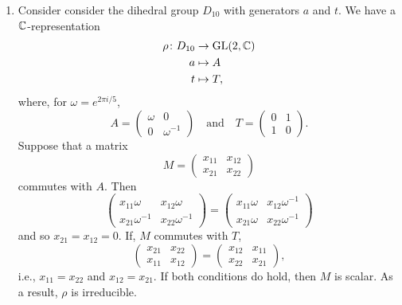 \begin{xmpls}
\begin{enumerate}[\rm a)]
        \item Consider consider the dihedral group $D_{10}$ with generators $a$ and $t$. We have a $\mathbb{C}$-representation
        \begin{align*}
           \rho\colon D_{10}&\to\operatorname{GL}(2,\mathbb{C})\\
            a&\mapsto A\\
            t&\mapsto T,
        \end{align*}
        where, for $\omega=e^{2\pi i/5}$,
        $$
            A = \begin{pmatrix}
                \omega  &0\\
                0   & \omega^{-1}
            \end{pmatrix}
            \quad\text{and}\quad
            T = \begin{pmatrix}
                0   &1\\
                1   &0
            \end{pmatrix}.
        $$
        Suppose that a matrix
        $$
            M = \begin{pmatrix}
                x_{11}  &x_{12}\\
                x_{21}  &x_{22}
            \end{pmatrix}
        $$
        commutes with $A$. Then
        $$
            \begin{pmatrix}
                x_{11}\omega\phantom{{}^{-1}}
                    &x_{12}\omega\phantom{{}^{-1}}\\
                x_{21}\omega^{-1}   &x_{22}\omega^{-1}
            \end{pmatrix}
            = \begin{pmatrix}
                x_{11}\omega    &x_{12}\omega^{-1}\\
                x_{21}\omega    &x_{22}\omega^{-1}
            \end{pmatrix}
        $$
        and so $x_{21}=x_{12}=0$. If, $M$ commutes with $T$,
        $$
            \begin{pmatrix}
                x_{21}  &x_{22}\\
                x_{11}  &x_{12}
            \end{pmatrix}
            = \begin{pmatrix}
                x_{12}  &x_{11}\\
                x_{22}  &x_{21}
            \end{pmatrix},
        $$
        i.e., $x_{11}=x_{22}$ and $x_{12}=x_{21}$. If both conditions do hold, then $M$ is scalar. As a result, $\rho$ is irreducible.
    \end{enumerate}
\end{xmpls}

